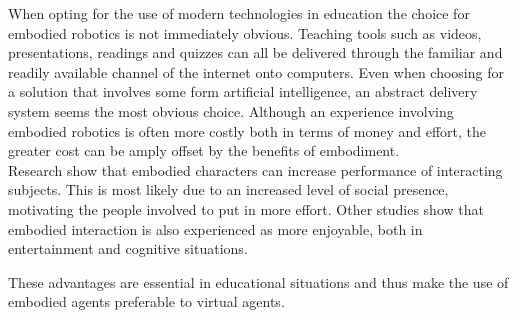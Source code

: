 When opting for the use of modern technologies in education the choice for embodied robotics is not immediately obvious. Teaching tools such as videos, presentations, readings and quizzes can all be delivered through the familiar and readily available channel of the internet onto computers. Even when choosing for a solution that involves some form artificial intelligence, an abstract delivery system seems the most obvious choice. Although an experience involving embodied robotics is often more costly both in terms of money and effort, the greater cost can be amply offset by the benefits of embodiment.\\

Research show that embodied characters can increase performance of interacting subjects. \cite{Bartneck2002} This is most likely due to an increased level of social presence, motivating the people involved to put in more effort. Other studies show that embodied interaction is also experienced as more enjoyable, both in entertainment \cite{Pereira2008} and cognitive situations.\cite{Tapus2009}

These advantages are essential in educational situations and thus make the use of embodied agents preferable to virtual agents.

